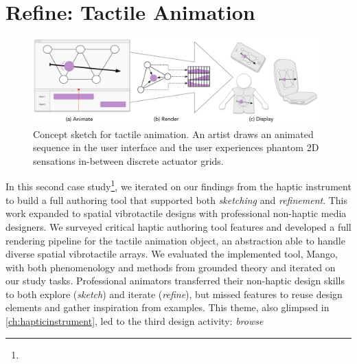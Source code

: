 

\newcommand{\qq}[2]{\emph{``#1"} (#2)}
\newcommand{\HAtheme}[2]{\textbf{Theme #1:} \uline{#2}\\}



\chapter{Refine: Tactile Animation}
\label{ch:tactileanimation}

\begin{figure}[h]
   \includegraphics[width=0.98\textwidth]{images/HA14-Concept-Sketch-2015-01-17-1127}
   \caption{Concept sketch for tactile animation. 
An artist draws an animated sequence in the user interface and the user experiences phantom 2D sensations in-between discrete actuator grids. 
}
   \label{fig:concept:sketch}
\end{figure}

  

\noindent
{} In this second case study\footnote{}, we iterated on our findings from the haptic instrument to build a full authoring tool that supported both \emph{sketching} and \emph{refinement}.
This work expanded to spatial vibrotactile designs with professional non-haptic media designers.
We surveyed critical haptic authoring tool features and developed a full rendering pipeline for the tactile animation object, an abstraction able to handle diverse spatial vibrotactile arrays. %
We evaluated the implemented tool, Mango, with both phenomenology and methods from grounded theory and iterated on our study tasks.
Professional animators transferred their non-haptic design skills to both explore (\emph{sketch}) and iterate (\emph{refine}), but missed features to reuse design elements and gather inspiration from examples.
This theme, also glimpsed in \autoref{ch:hapticinstrument}, led to the third design activity: \emph{browse}

